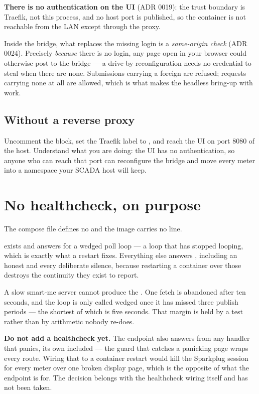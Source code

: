 \begin{note}
\textbf{There is no authentication on the UI} (ADR 0019): the trust boundary is
Traefik, not this process, and no host port is published, so the container is not
reachable from the LAN except through the proxy.

Inside the bridge, what replaces the missing login is a \emph{same-origin check}
(ADR 0024). Precisely \emph{because} there is no login, any page open in your browser
could otherwise post to the bridge --- a drive-by reconfiguration needs no credential
to steal when there are none. Submissions carrying a foreign  are
refused; requests carrying none at all are allowed, which is what makes the headless
bring-up with  work.
\end{note}

\subsection{Without a reverse proxy}

Uncomment the  block, set the Traefik label to
, and reach the UI on port 8080 of the host. Understand what you are
doing: the UI has no authentication, so anyone who can reach that port can
reconfigure the bridge and move every meter into a namespace your SCADA host will
keep.

\section{No healthcheck, on purpose}
\label{sec:install-healthcheck}

The compose file defines no  and the image carries no
 line.

 exists and answers  for a wedged poll loop --- a loop that
has stopped looping, which is exactly what a restart fixes. Everything else answers
, including an honest  and every deliberate silence, because
restarting a container over those destroys the continuity they exist to report.

A slow smart-me server cannot produce the . One fetch is abandoned after
ten seconds, and the loop is only called wedged once it has missed three publish
periods --- the shortest of which is five seconds. That margin is held by a test
rather than by arithmetic nobody re-does.

\begin{warning}
\textbf{Do not add a healthcheck yet.} The endpoint also answers  from any
handler that panics, its own included --- the guard that catches a panicking page
wraps every route. Wiring that to a container restart would kill the Sparkplug
session for every meter over one broken display page, which is the opposite of what
the endpoint is for. The decision belongs with the healthcheck wiring itself and has
not been taken.
\end{warning}

